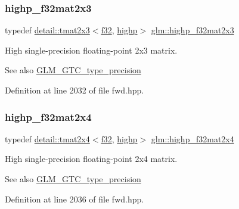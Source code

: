 \subsubsection{\texorpdfstring{highp\+\_\+f32mat2x3}{highp\_f32mat2x3}}
{\footnotesize\ttfamily typedef \hyperlink{structglm_1_1detail_1_1tmat2x3}{detail\+::tmat2x3}$<$\hyperlink{group__gtc__type__precision_ga0ec999b57f5330d9021256e96038df04}{f32}, \hyperlink{namespaceglm_a0f04f086094c747d227af4425893f545ac6f7eab42eacbb10d59a58e95e362074}{highp}$>$ \hyperlink{group__gtc__type__precision_ga53613c1b93f81207065a8a935ff02a81}{glm\+::highp\+\_\+f32mat2x3}}

High single-\/precision floating-\/point 2x3 matrix. \begin{DoxySeeAlso}{See also}
\hyperlink{group__gtc__type__precision}{G\+L\+M\+\_\+\+G\+T\+C\+\_\+type\+\_\+precision} 
\end{DoxySeeAlso}


Definition at line 2032 of file fwd.\+hpp.

\mbox{\label{group__gtc__type__precision_ga9689dbe21bc976ca8069c63300b5887e}} 
\subsubsection{\texorpdfstring{highp\+\_\+f32mat2x4}{highp\_f32mat2x4}}
{\footnotesize\ttfamily typedef \hyperlink{structglm_1_1detail_1_1tmat2x4}{detail\+::tmat2x4}$<$\hyperlink{group__gtc__type__precision_ga0ec999b57f5330d9021256e96038df04}{f32}, \hyperlink{namespaceglm_a0f04f086094c747d227af4425893f545ac6f7eab42eacbb10d59a58e95e362074}{highp}$>$ \hyperlink{group__gtc__type__precision_ga9689dbe21bc976ca8069c63300b5887e}{glm\+::highp\+\_\+f32mat2x4}}

High single-\/precision floating-\/point 2x4 matrix. \begin{DoxySeeAlso}{See also}
\hyperlink{group__gtc__type__precision}{G\+L\+M\+\_\+\+G\+T\+C\+\_\+type\+\_\+precision} 
\end{DoxySeeAlso}


Definition at line 2036 of file fwd.\+hpp.

\mbox{\label{group__gtc__type__precision_ga06809818db73785334f839742a9ad85a}} 
